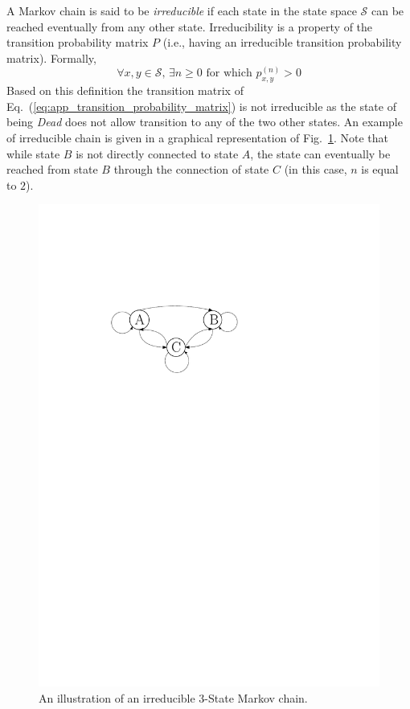 A Markov chain is said to be \emph{irreducible} if each state in the state space $\mathcal{S}$ can be reached eventually from any other state.
Irreducibility is a property of the transition probability matrix $P$ (i.e., having an irreducible transition probability matrix).
Formally,
\begin{equation}
	\forall x, y \in \mathcal{S}, \, \exists n \geq 0 \,\, \text{for which} \,\, p_{x,y}^{(n)} > 0
\label{eq:app_irreducibility}
\end{equation}
Based on this definition the transition matrix of Eq.~(\ref{eq:app_transition_probability_matrix}) is not irreducible as the state of being \emph{Dead} does not allow transition to any of the two other states.
An example of irreducible chain is given in a graphical representation of Fig.~\ref{fig:app_markov_chain_irreducible}.
Note that while state $B$ is not directly connected to state $A$,
the state can eventually be reached from state $B$ through the connection of state $C$ (in this case, $n$ is equal to $2$).
\begin{figure}[bth]
	\centering
	\includegraphics[width=1.0\textwidth]{../figures/chapter5/figures/markov_chain_irreducible.pdf}
	\caption[Illustration of an irreducible $3$-State Markov Chain]{An illustration of an irreducible $3$-State Markov chain.}
	\label{fig:app_markov_chain_irreducible}
\end{figure}

